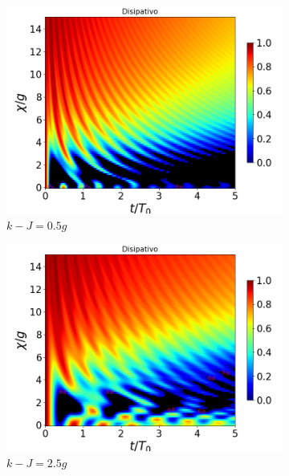 \begin{figure}[h]
    \vfill
    \begin{subfigure}{0.49\textwidth}
        \includegraphics[width=\textwidth]{figuras/ch4/concu/chi/eg1+ge1 d=0.0g k=0.5g J=0.0g gamma=0.25g concu chi dis.png}
        \caption{$k-J=0.5g$}
        \label{fig4:concu x 1 k1}
    \end{subfigure}
    \hfill
    \begin{subfigure}{0.49\textwidth}
        \includegraphics[width=\textwidth]{figuras/ch4/concu/chi/eg1+ge1 d=0.0g k=2.5g J=0.0g gamma=0.25g concu chi dis.png}
        \caption{$k-J=2.5g$}
        \label{fig4:concu x 1 k2}
    \end{subfigure}
    \caption{}
    \label{fig4:concu x params 1}
\end{figure}
